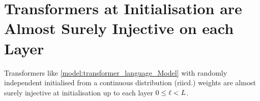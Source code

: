\section{Transformers at Initialisation are Almost Surely Injective on each Layer}
\label{app:injectivity_Transformer}
\newcommand{\Parameters}{\Theta}%
\newcommand{\InputSet}{\mathcal{H}}
\newcommand{\InputSetRand}{H}
\newcommand{\Conditions}{C}
\newcommand{\pdfun}[1]{\mathrm{p}_{#1}}
\newcommand{\sequencesize}{s}
\newcommand{\tokenposition}{t}
\newcommand{\tokenposRange}{T}
\newcommand{\tokenidx}[2]{[#1]_{#2}}
\newcommand{\numtoks}[1]{\lvert#1\rvert}
\newcommand{\calZ}{\mathcal{Z}}

\begin{thm}\label{thm:injectivity}
    Transformers like \cref{model:transformer_language_Model} with randomly independent initialised from a continuous distribution (riicd.) weights are almost surely injective at initialisation up to each layer $0\leq\ell<L$.
\end{thm}
